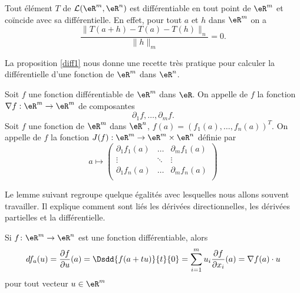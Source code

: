 \begin{remark}\label{rk_lin}
  Tout élément $T$ de $\mathcal{L}(\eR^m,\eR^n)$ est différentiable en tout point de $\eR^m$ et coïncide avec sa différentielle. En effet, pour tout $a$ et $h$ dans $\eR^m$  on a 
\[
\frac{\|T(a+h)-T(a)-T(h)\|_n}{\|h\|_m}=0.
\]
\end{remark}
La proposition \ref{diff1} nous donne une recette très pratique pour calculer la différentielle d'une fonction de $\eR^m$ dans $\eR^n$.

 \begin{definition}
	 Soit $f$ une fonction différentiable de $\eR^m$ dans $\eR$. On appelle  de $f$ la fonction $\nabla f : \eR^m\to \eR^m$ de composantes
\[
\partial_{1}f,\ldots,\partial_{m}f. 
\] 
Soit $f$ une fonction de $\eR^m$ dans $\eR^n$, $f(a)=(f_1(a),\ldots,f_n(a))^T$. On appelle  de $f$ la fonction $J(f) : \eR^m\to \eR^m\times\eR^n$ définie par
\begin{equation}
a\mapsto  \begin{pmatrix}
    \partial_{1}f_1(a) &\ldots&\partial_{m}f_1(a)\\
\vdots&\ddots&\vdots\\
\partial_{1}f_n (a)&\ldots&\partial_{m}f_n(a)\\
  \end{pmatrix}
\end{equation}
\end{definition}

Le lemme suivant regroupe quelque égalités avec lesquelles nous allons souvent travailler. Il explique comment sont liés les dérivées directionnelles, les dérivées partielles et la différentielle.
\begin{lemma}		\label{LemdfaSurLesPartielles}
	Si $f\colon \eR^m\to \eR^n$ est une fonction différentiable, alors
	\begin{equation}
        df_a(u)=\frac{ \partial f }{ \partial u }(a)=\Dsdd{ f(a+tu) }{t}{0}=\sum_{i=1}^mu_i\frac{ \partial f }{ \partial x_i }(a)=\nabla f(a)\cdot u
	\end{equation}
	pour tout vecteur $u\in\eR^m$
\end{lemma}

